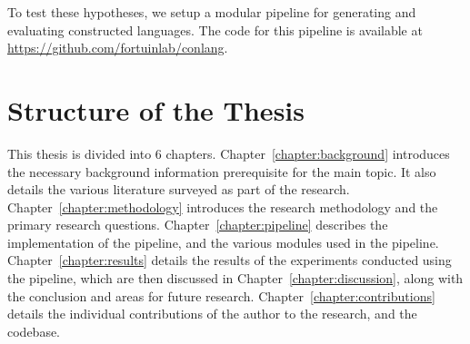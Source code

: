 
To test these hypotheses, we setup a modular pipeline for generating and evaluating constructed languages. The code for this pipeline is available at 
\url{https://github.com/fortuinlab/conlang}. 

\section{Structure of the Thesis}

This thesis is divided into 6 chapters. Chapter~\ref{chapter:background} introduces the necessary background information prerequisite for the main topic.
It also details the various literature surveyed as part of the research.  Chapter~\ref{chapter:methodology} introduces the research methodology and the
primary research questions.  Chapter~\ref{chapter:pipeline} describes the implementation of the pipeline, and the various modules used in the pipeline.
 Chapter~\ref{chapter:results} details the results of the experiments conducted using the pipeline, which are then discussed in  Chapter~\ref{chapter:discussion},
along with the conclusion and areas for future research.  Chapter~\ref{chapter:contributions} details the individual contributions of the author to the research, and the codebase. 